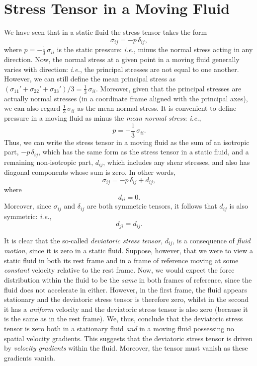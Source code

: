 \section{Stress Tensor in a Moving Fluid}\label{sstress}
We have seen that  in a static fluid the stress tensor takes the form
\begin{equation}
\sigma_{ij} = -p\,\delta_{ij},
\end{equation}
where $p=-\frac{1}{3}\,\sigma_{ii}$ is the static pressure: {\em i.e.}, minus the normal stress acting in any direction.
Now,  the normal stress at a given point in a moving fluid generally varies with direction: {\em i.e.}, the principal stresses are
not equal to one another. However, we can still define the mean principal stress as $(\sigma_{11}'+\sigma_{22}'+\sigma_{33}')/3= \frac{1}{3}\,\sigma_{ii}$.
Moreover, given that the  principal stresses are actually normal stresses (in a coordinate frame aligned with the principal axes), we can also regard  $\frac{1}{3}\,\sigma_{ii}$
as the mean normal stress. 
It is convenient to define pressure in a moving fluid as minus the {\em mean normal
stress}: {\em i.e.}, 
\begin{equation}
p= -\frac{1}{3}\,\sigma_{ii}.
\end{equation}
Thus, we can write the stress tensor in a moving fluid as the sum of an isotropic part, $-p\,\delta_{ij}$,
which has the same form as the stress tensor in a static fluid, and a remaining non-isotropic
part, $d_{ij}$, which includes any shear stresses, and also has diagonal components whose
sum is zero. In other words,
\begin{equation}
\sigma_{ij} = - p\,\delta_{ij} + d_{ij},
\end{equation}
where
\begin{equation}
d_{ii} = 0.\label{e4.18}
\end{equation}
Moreover, since $\sigma_{ij}$ and $\delta_{ij}$ are both symmetric tensors, it follows that
$d_{ij}$ is also symmetric: {\em i.e.}, 
\begin{equation}
d_{ji} = d_{ij}.\label{e4.19}
\end{equation}

It is clear that the so-called {\em deviatoric stress tensor}, $d_{ij}$, is a consequence of {\em fluid motion}, since
it is zero in a static fluid. Suppose, however, that we were to view a static fluid in both its rest frame and  in a frame of reference moving at
 some {\em constant}\/ velocity relative to the rest frame. Now, we would expect the force distribution within the fluid to
 be the {\em same}\/ in both frames of reference, since the fluid does not accelerate in either. 
 However, in the first frame, the fluid appears stationary and the deviatoric stress tensor is therefore zero, whilst in the second it has a {\em uniform}\/ velocity and the deviatoric stress tensor is also zero (because it is the same as in the rest frame).
 We, thus, conclude that the deviatoric stress tensor is zero   both in a stationary fluid {\em and}\/ in a moving fluid
 possessing  no spatial velocity gradients. This suggests that the deviatoric stress tensor is driven by {\em velocity gradients}\/
 within the fluid. Moreover, the tensor must vanish as these gradients vanish. 
 
